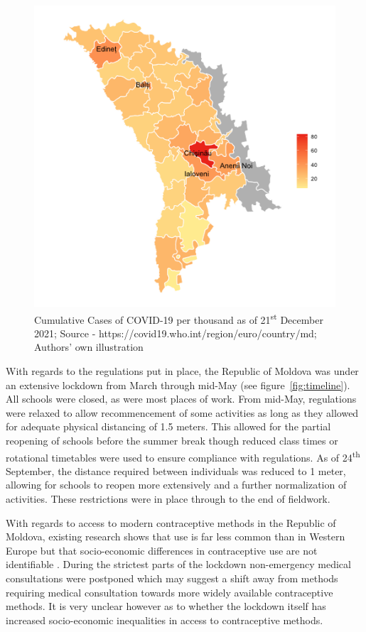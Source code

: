 \documentclass[10pt,letterpaper]{article}
\begin{document}
\begin{figure}
\centering
\includegraphics[width=\textwidth]{fig1.png}
\caption{Cumulative Cases of COVID-19 per thousand as of 21\textsuperscript{st} December 2021; Source - https://covid19.who.int/region/euro/country/md; Authors' own illustration}
\label{fig:map}
\end{figure}

With regards to the regulations put in place, the Republic of Moldova was under an extensive lockdown from March through mid-May (see figure~\ref{fig:timeline}). All schools were closed, as were most places of work. From mid-May, regulations were relaxed to allow recommencement of some activities as long as they allowed for adequate physical distancing of 1.5 meters. This allowed for the partial reopening of schools before the summer break though reduced class times or rotational timetables were used to ensure compliance with regulations. As of 24\textsuperscript{th} September, the distance required between individuals was reduced to 1 meter, allowing for schools to reopen more extensively and a further normalization of activities. These restrictions were in place through to the end of fieldwork.

With regards to access to modern contraceptive methods in the Republic of Moldova, existing research shows that use is far less common than in Western Europe but that socio-economic differences in contraceptive use are not identifiable \cite{janevic2012individual}. During the strictest parts of the lockdown non-emergency medical consultations were postponed which may suggest a shift away from methods requiring medical consultation towards more widely available contraceptive methods. It is very unclear however as to whether the lockdown itself has increased socio-economic inequalities in access to contraceptive methods.
\end{document}
